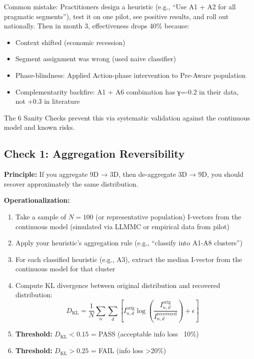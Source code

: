 \begin{tcolorbox}[colback=red!5!white, colframe=red!75!black, title=\textbf{The Validation Problem}]

Common mistake: Practitioners design a heuristic (e.g., ``Use A1 + A2 for all pragmatic segments''), test it on one pilot, see positive results, and roll out nationally. Then in month 3, effectiveness drops 40\% because:
\begin{itemize}[nosep]
\item Context shifted (economic recession)
\item Segment assignment was wrong (used naive classifier)
\item Phase-blindness: Applied Action-phase intervention to Pre-Aware population
\item Complementarity backfire: A1 + A6 combination has γ=-0.2 in their data, not +0.3 in literature
\end{itemize}

The 6 Sanity Checks prevent this via systematic validation against the continuous model and known risks.

\end{tcolorbox}

\subsection{Check 1: Aggregation Reversibility}
\label{subsec:20-check-1}

\textbf{Principle:} If you aggregate 9D → 3D, then de-aggregate 3D → 9D, you should recover approximately the same distribution.

\textbf{Operationalization:}

\begin{enumerate}
\item Take a sample of $N=100$ (or representative population) I-vectors from the continuous model (simulated via LLMMC or empirical data from pilot)
\item Apply your heuristic's aggregation rule (e.g., ``classify into A1-A8 clusters'')
\item For each classified heuristic (e.g., A3), extract the median I-vector from the continuous model for that cluster
\item Compute KL divergence between original distribution and recovered distribution:
\begin{equation}
D_{\text{KL}} = \frac{1}{N} \sum_n \sum_d [I_{n,d}^{\text{orig}} \log(\frac{I_{n,d}^{\text{orig}}}{I_{n,d}^{\text{recovered}}}) + \epsilon]
\end{equation}

\item \textbf{Threshold:} $D_{\text{KL}} < 0.15$ = PASS (acceptable info loss ~10\%)
\item \textbf{Threshold:} $D_{\text{KL}} > 0.25$ = FAIL (info loss >20\%)

\end{enumerate}

